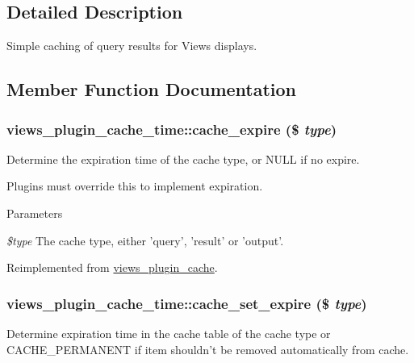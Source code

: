 \subsection{Detailed Description}
Simple caching of query results for Views displays. 

\subsection{Member Function Documentation}
\hypertarget{classviews__plugin__cache__time_a6e04720a6807812cfb5840ea7b49baaa}{
\subsubsection[{cache\_\-expire}]{\setlength{\rightskip}{0pt plus 5cm}views\_\-plugin\_\-cache\_\-time::cache\_\-expire (\$ {\em type})}}
\label{classviews__plugin__cache__time_a6e04720a6807812cfb5840ea7b49baaa}
Determine the expiration time of the cache type, or NULL if no expire.

Plugins must override this to implement expiration.


\begin{DoxyParams}{Parameters}
\item[{\em \$type}]The cache type, either 'query', 'result' or 'output'. \end{DoxyParams}


Reimplemented from \hyperlink{classviews__plugin__cache_ababefa702965b1e9123a9cdc620f7d52}{views\_\-plugin\_\-cache}.\hypertarget{classviews__plugin__cache__time_ab816b7a602e3225387b41c0e7950a54c}{
\subsubsection[{cache\_\-set\_\-expire}]{\setlength{\rightskip}{0pt plus 5cm}views\_\-plugin\_\-cache\_\-time::cache\_\-set\_\-expire (\$ {\em type})}}
\label{classviews__plugin__cache__time_ab816b7a602e3225387b41c0e7950a54c}
Determine expiration time in the cache table of the cache type or CACHE\_\-PERMANENT if item shouldn't be removed automatically from cache.

